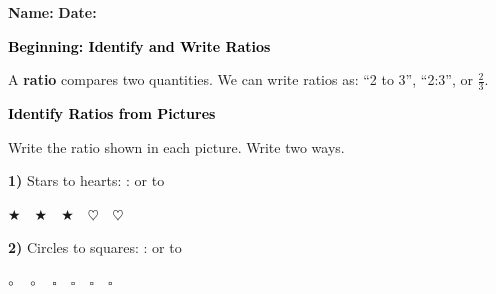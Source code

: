 \documentclass[12pt, letterpaper, fleqn]{article}
\newcommand{\blank}{\underline{\hspace{2.2cm}}}
\newcommand{\blankshorter}{\underline{\hspace{1.5cm}}}
\begin{document}
\textbf{Name:} \underline{\hspace{5cm}}
\hfill
\textbf{Date:} \underline{\hspace{3cm}}\\

\begin{tcolorbox}[colback=customteal!20]
    \large\textcolor{black}{\textbf{Beginning: Identify and Write Ratios}}
\end{tcolorbox}

\vspace{3mm}

\noindent
A \textbf{ratio} compares two quantities. We can write ratios as: ``2 to 3'', ``2:3'', or $\frac{2}{3}$.

\vspace{4mm}

\begin{tcolorbox}[colback=customteal!20]
\large\textcolor{black}{\textbf{Identify Ratios from Pictures}}
\end{tcolorbox}

\vspace{3mm}

\noindent
Write the ratio shown in each picture. Write two ways.
\vspace{1.5cm}

\noindent
\textbf{1)} Stars to hearts: \blank : \blank \quad or \quad \blankshorter \quad to \blankshorter

\begin{center}
$\bigstar \quad \bigstar \quad \bigstar \quad \heartsuit \quad \heartsuit$
\end{center}

\vspace{2cm}
\vspace{2mm}

\noindent
\textbf{2)} Circles to squares: \blank : \blank \quad or \quad \blankshorter \quad to \blankshorter

\begin{center}
$\circ \quad \circ \quad \square \quad \square \quad \square \quad \square$
\end{center}

\vspace{2cm}
\vspace{2mm}
\end{document}
